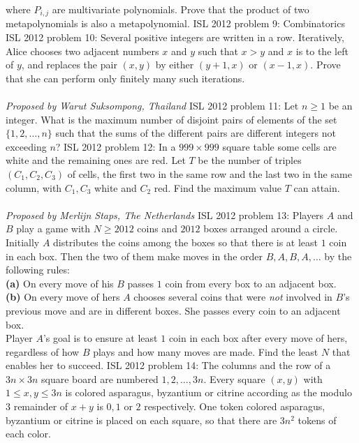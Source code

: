 where $P_{i,j}$ are multivariate polynomials. Prove that the product of two metapolynomials is also a metapolynomial. 
ISL 2012 problem 9:  Combinatorics 
ISL 2012 problem 10:  Several positive integers are written in a row. Iteratively, Alice chooses two adjacent numbers $x$ and $y$ such that $x>y$ and $x$ is to the left of $y$, and replaces the pair $(x,y)$ by either $(y+1,x)$ or $(x-1,x)$. Prove that she can perform only finitely many such iterations. \\\\
\textit{Proposed by Warut Suksompong, Thailand} 
ISL 2012 problem 11:  Let $n \geq 1$ be an integer. What is the maximum number of disjoint pairs of elements of the set $\{ 1,2,\ldots , n \}$ such that the sums of the different pairs are different integers not exceeding $n$? 
ISL 2012 problem 12:  In a $999 \times 999$ square table some cells are white and the remaining ones are red. Let $T$ be the number of triples $(C_1,C_2,C_3)$ of cells, the first two in the same row and the last two in the same column, with $C_1,C_3$ white and $C_2$ red. Find the maximum value $T$ can attain. \\\\
\textit{Proposed by Merlijn Staps, The Netherlands} 
ISL 2012 problem 13:  Players $A$ and $B$ play a game with $N \geq 2012$ coins and $2012$ boxes arranged around a circle. Initially $A$ distributes the coins among the boxes so that there is at least $1$ coin in each box. Then the two of them make moves in the order $B,A,B,A,\ldots $ by the following rules: \\
\textbf{(a)} On every move of his $B$ passes $1$ coin from every box to an adjacent box. \\
\textbf{(b)} On every move of hers $A$ chooses several coins that were \textit{not} involved in $B$'s previous move and are in different boxes. She passes every coin to an adjacent box. \\
Player $A$'s goal is to ensure at least $1$ coin in each box after every move of hers, regardless of how $B$ plays and how many moves are made. Find the least $N$ that enables her to succeed. 
ISL 2012 problem 14:  The columns and the row of a $3n \times 3n$ square board are numbered $1,2,\ldots ,3n$. Every square $(x,y)$ with $1 \leq x,y \leq 3n$ is colored asparagus, byzantium or citrine according as the modulo $3$ remainder of $x+y$ is $0,1$ or $2$ respectively. One token colored asparagus, byzantium or citrine is placed on each square, so that there are $3n^2$ tokens of each color. \\
